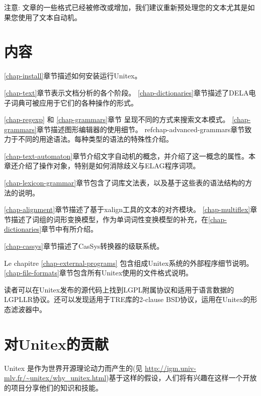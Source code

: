 \bigskip
\noindent 注意: 文章的一些格式已经被修改或增加，我们建议重新预处理您的文本尤其是如果您使用了文本自动机。

\clearpage

\section*{内容}
\noindent \ref{chap-install}章节描述如何安装运行Unitex。

\bigskip \noindent  \ref{chap-text}章节表示文档分析的各个阶段。 
\bigskip \noindent \ref{chap-dictionaries}章节描述了DELA电子词典可被应用于它们的各种操作的形式。

\bigskip \noindent \ref{chap-regexp} 和 \ref{chap-grammars}章节
呈现不同的方式来搜索文本模式。
\ref{chap-grammars}章节描述图形编辑器的使用细节。
\bigskip \noindent ref{chap-advanced-grammars}章节致力于不同的用途语法。每种类型的语法的特殊性介绍。

\bigskip \noindent \ref{chap-text-automaton}章节介绍文字自动机的概念，并介绍了这一概念的属性。本章还介绍了操作对象，特别是如何消除歧义与ELAG程序词项。

\bigskip \noindent  \ref{chap-lexicon-grammar}章节包含了词库文法表，以及基于这些表的语法结构的方法的说明。 

\bigskip \noindent  \ref{chap-alignment}章节描述了基于xalign工具的文本的对齐模块。
\bigskip \noindent \ref{chap-multiflex}章节描述了词组的词形变换模型，作为单词词性变换模型的补充，在\ref{chap-dictionaries}章节中有所介绍。 

\bigskip \noindent  \ref{chap-cassys}章节描述了CasSys转换器的级联系统。

\bigskip \noindent Le chapitre \ref{chap-external-programs} 包含组成Unitex系统的外部程序细节说明。
\bigskip \noindent \ref{chap-file-formats}章节包含所有Unitex使用的文件格式说明。

\bigskip \noindent 
读者可以在Unitex发布的源代码上找到LGPL附属协议和适用于语言数据的LGPLLR协议。还可以发现适用于TRE库的2-clause BSD协议，运用在Unitex的形态滤波器中。


\clearpage

\section*{对Unitex的贡献}
Unitex 是作为世界开源理论动力而产生的(见 \url{http://igm.univ-mlv.fr/~unitex/why_unitex.html})基于这样的假设，人们将有兴趣在这样一个开放的项目分享他们的知识和技能。



